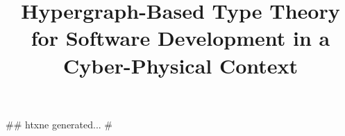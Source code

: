 ## htxne generated...
#  
\title{Hypergraph-Based Type Theory 
for Software Development in a Cyber-Physical Context}